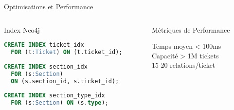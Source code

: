 \documentclass[10pt, aspectratio=169]{beamer}
\begin{document}
\begin{frame}{Optimisations et Performance}
    \begin{columns}[T]
        \begin{column}{0.5\textwidth}
            \begin{block}{Index Neo4j}
                \begin{lstlisting}[language=SQL, basicstyle=\tiny\ttfamily]
CREATE INDEX ticket_idx 
  FOR (t:Ticket) ON (t.ticket_id);
  
CREATE INDEX section_idx 
  FOR (s:Section) 
  ON (s.section_id, s.ticket_id);
  
CREATE INDEX section_type_idx 
  FOR (s:Section) ON (s.type);
                \end{lstlisting}
            \end{block}
        \end{column}
        
        \begin{column}{0.5\textwidth}
            \begin{block}{Métriques de Performance}
                \begin{center}
                \end{center}
                \footnotesize
                \faCheckCircle{} Temps moyen < 100ms\\
                \faDatabase{} Capacité > 1M tickets\\
                \faLink{} 15-20 relations/ticket
            \end{block}
        \end{column}
    \end{columns}
\end{frame}
\end{document}
